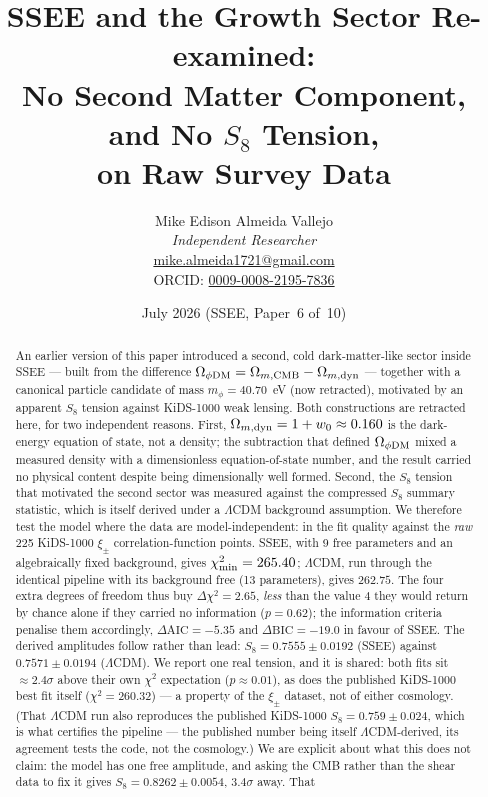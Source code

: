 \documentclass[12pt,a4paper]{article}
\title{\textbf{SSEE and the Growth Sector Re-examined:\\
No Second Matter Component, and No $S_8$ Tension,\\
on Raw Survey Data}}
\author{Mike Edison Almeida Vallejo \\
\small \textit{Independent Researcher} \\
\small \href{mailto:mike.almeida1721@gmail.com}{mike.almeida1721@gmail.com} \\
\small ORCID: \href{https://orcid.org/0009-0008-2195-7836}{0009-0008-2195-7836}
}
\date{July 2026 \quad (SSEE, Paper~6 of~10)}
\newcommand{\SSEE}{\textsc{SSEE}}
\begin{document}
\maketitle

\begin{abstract}
An earlier version of this paper introduced a second, cold dark-matter-like
sector inside \SSEE{} --- built from the difference
$\Omega_{\phi\rm DM}=\Omega_{m,\rm CMB}-\Omega_{m,\rm dyn}$ --- together with a
canonical particle candidate of mass $m_\phi=40.70$~eV (now retracted),
motivated by an apparent $S_8$ tension against KiDS-1000 weak lensing.
Both constructions are retracted here, for two independent reasons. First,
$\Omega_{m,\rm dyn}=1+w_0\approx0.160$ is the dark-energy equation of state,
not a density; the subtraction that defined $\Omega_{\phi\rm DM}$ mixed a
measured density with a dimensionless equation-of-state number, and the
result carried no physical content despite being dimensionally well formed.
Second, the $S_8$ tension that motivated the second sector was measured
against the compressed $S_8$ summary statistic, which is itself derived
under a $\Lambda$CDM background assumption. We therefore test the model
where the data are model-independent: in the fit quality against the
\emph{raw} 225 KiDS-1000 $\xi_\pm$ correlation-function points. \SSEE{},
with 9 free parameters and an algebraically fixed background, gives
$\chi^2_{\rm min}=265.40$; $\Lambda$CDM, run through the identical pipeline
with its background free (13 parameters), gives $262.75$. The four extra
degrees of freedom thus buy $\Delta\chi^2=2.65$, \emph{less} than the value
$4$ they would return by chance alone if they carried no information
($p=0.62$); the information criteria penalise them accordingly,
$\Delta\mathrm{AIC}=-5.35$ and $\Delta\mathrm{BIC}=-19.0$ in favour of
\SSEE{}. The derived amplitudes follow rather than lead: $S_8=0.7555\pm0.0192$
(\SSEE{}) against $0.7571\pm0.0194$ ($\Lambda$CDM). We report one real
tension, and it is shared: both fits sit $\approx2.4\sigma$ above their own
$\chi^2$ expectation ($p\approx0.01$), as does the published KiDS-1000
best fit itself ($\chi^2=260.32$) --- a property of the $\xi_\pm$ dataset,
not of either cosmology. (That $\Lambda$CDM run also reproduces the published
KiDS-1000 $S_8=0.759\pm0.024$, which is what certifies the pipeline --- the
published number being itself $\Lambda$CDM-derived, its agreement tests the
code, not the cosmology.) We are explicit about what this does not
claim: the model has one free amplitude, and asking the CMB rather than the
shear data to fix it gives $S_8=0.8262\pm0.0054$, $3.4\sigma$ away. That

\end{abstract}
\end{document}
